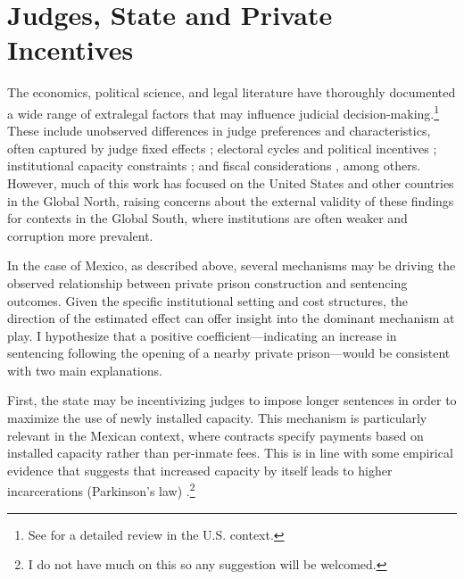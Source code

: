 \section{Judges, State and Private Incentives}
\label{sec:theory}
The economics, political science, and legal literature have thoroughly documented a wide range of extralegal factors that may influence judicial decision-making.\footnote{See \cite{Posner-Judges} for a detailed review in the U.S. context.} These include unobserved differences in judge preferences and characteristics, often captured by judge fixed effects \citep{Kling-Random, Aizer-Juvenile}; electoral cycles and political incentives \citep{Gordon-Judges-Election, Berdejo-PoliticalCycles}; institutional capacity constraints \citep{Schnepel}; and fiscal considerations \citep{Ouss-Incentives}, among others. However, much of this work has focused on the United States and other countries in the Global North, raising concerns about the external validity of these findings for contexts in the Global South, where institutions are often weaker and corruption more prevalent.

In the case of Mexico, as described above, several mechanisms may be driving the observed relationship between private prison construction and sentencing outcomes. Given the specific institutional setting and cost structures, the direction of the estimated effect can offer insight into the dominant mechanism at play. I hypothesize that a positive coefficient—indicating an increase in sentencing following the opening of a nearby private prison—would be consistent with two main explanations.

First, the state may be incentivizing judges to impose longer sentences in order to maximize the use of newly installed capacity. This mechanism is particularly relevant in the Mexican context, where contracts specify payments based on installed capacity rather than per-inmate fees. This is in line with some empirical evidence that suggests that increased capacity by itself leads to higher incarcerations (Parkinson's law) \citep{Parkinson-Stolz}.\footnote{I do not have much on this so any suggestion will be welcomed.}


